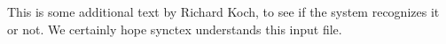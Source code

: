 This is some additional text by Richard Koch, to see if the system
recognizes it or not.
We certainly hope synctex understands this input file.
